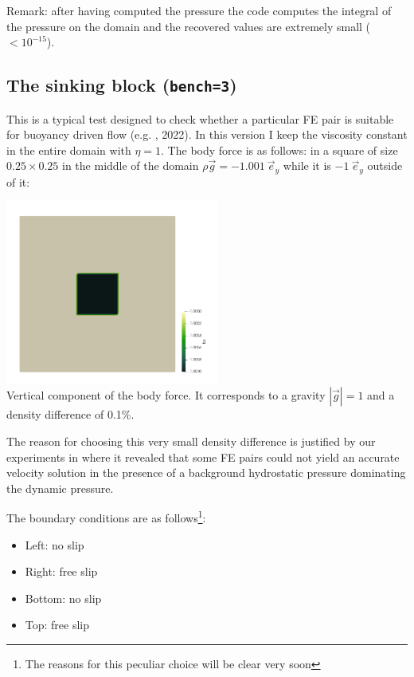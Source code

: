 Remark: after having computed the pressure the code computes the integral of the pressure 
on the domain and the recovered values are extremely small ($<10^{-15}$).  

\subsection*{The sinking block ({\tt bench=3})}

This is a typical test designed to check whether a particular 
FE pair is suitable for buoyancy driven flow (e.g. \textcite{thba22}, 2022).
In this version I keep the viscosity constant in the entire domain with $\eta=1$.
The body force is as follows: in a square of size $0.25\times 0.25$ in the middle of the domain
$\rho \vec{g}=-1.001~\vec{e}_y$ while it is $-1~\vec{e}_y$ outside of it:

\begin{center}
\includegraphics[width=7cm]{python_codes/fieldstone_161/results/bench3/by}\\
{\captionfont Vertical component of the body force. 
It corresponds to a gravity $|\vec{g}|=1$
and a density difference of 0.1\%.}
\end{center}

The reason for choosing this very small density difference is justified by our 
experiments in \textcite{thba22} where it revealed that some FE pairs could not yield 
an accurate velocity solution in the presence of a background hydrostatic pressure
dominating the dynamic pressure. 

The boundary conditions are as follows\footnote{The reasons for this 
peculiar choice will be clear very soon}:
\begin{itemize}
\item Left: no slip
\item Right: free slip
\item Bottom: no slip
\item Top: free slip
\end{itemize}

